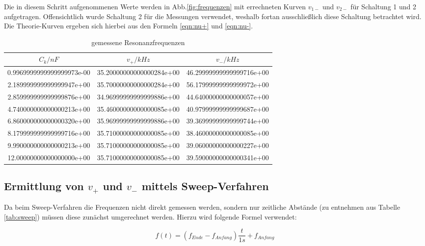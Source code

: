 Die in diesem Schritt aufgenommenen Werte werden in Abb.\ref{fig:frequenzen} mit errechneten Kurven $v_{1-}$ und $v_{2-}$ für Schaltung 1 und 2 aufgetragen. Offensichtlich wurde Schaltung 2 für die Messungen verwendet, weshalb fortan ausschließlich diese Schaltung betrachtet wird. Die Theorie-Kurven ergeben sich hierbei aus den Formeln \eqref{eqn:nu+} und \eqref{eqn:nu-}.

\begin{table}
  \centering
\caption{gemessene Resonanzfrequenzen}
\label{tab:verhaeltnisse}
\begin{tabular}{S S S}
  \toprule
  {$C_k/nF$} & {$v_+/kHz$} & {$v_-/kHz$}\\
  \midrule
  0.9969999999999999973e-00 & 35.20000000000000284e+00 & 46.29999999999999716e+00\\
  2.189999999999999947e+00 & 35.70000000000000284e+00 & 56.17999999999999972e+00\\
  2.859999999999999876e+00 & 34.96999999999999886e+00 & 44.64000000000000057e+00\\
  4.740000000000000213e+00 & 35.46000000000000085e+00 & 40.97999999999999687e+00\\
  6.860000000000000320e+00 & 35.96999999999999886e+00 & 39.36999999999999744e+00\\
  8.179999999999999716e+00 & 35.71000000000000085e+00 & 38.46000000000000085e+00\\
  9.990000000000000213e+00 & 35.71000000000000085e+00 & 39.06000000000000227e+00\\
  12.00000000000000000e+00 & 35.71000000000000085e+00 & 39.59000000000000341e+00\\
\bottomrule
\end{tabular}
\end{table}
\FloatBarrier


\subsection{Ermittlung von $v_+$ und $v_-$ mittels Sweep-Verfahren}
\label{sec:sweep}

Da beim Sweep-Verfahren die Frequenzen nicht direkt gemessen werden, sondern nur zeitliche Abstände (zu entnehmen aus Tabelle \ref{tab:sweep}) müssen diese zunächst umgerechnet werden. Hierzu wird folgende Formel verwendet:

\begin{equation}
  f(t) = ( f_{Ende} - f_{Anfang} ) \frac{t}{1s} + f_{Anfang}
\end{equation}

